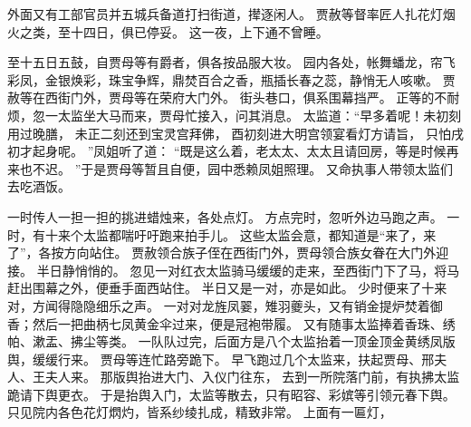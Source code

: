 外面又有工部官员并五城兵备道打扫街道，撵逐闲人。
贾赦等督率匠人扎花灯烟火之类，至十四日，俱已停妥。
这一夜，上下通不曾睡。
\par
至十五日五鼓，自贾母等有爵者，俱各按品服大妆。
园内各处，帐舞蟠龙，帘飞彩凤，金银焕彩，珠宝争辉，鼎焚百合之香，瓶插长春之蕊，静悄无人咳嗽。
贾赦等在西街门外，贾母等在荣府大门外。
街头巷口，俱系围幕挡严。
正等的不耐烦，忽一太监坐大马而来，贾母忙接入，问其消息。
太监道：“早多着呢！未初刻用过晚膳，
未正二刻还到宝灵宫拜佛，
酉初刻进大明宫领宴看灯方请旨，
只怕戌初才起身呢。
”凤姐听了道：
“既是这么着，老太太、太太且请回房，等是时候再来也不迟。
”于是贾母等暂且自便，园中悉赖凤姐照理。
又命执事人带领太监们去吃酒饭。
\par
一时传人一担一担的挑进蜡烛来，各处点灯。
方点完时，忽听外边马跑之声。
一时，有十来个太监都喘吁吁跑来拍手儿。
这些太监会意，都知道是“来了，来了”，各按方向站住。
贾赦领合族子侄在西街门外，贾母领合族女眷在大门外迎接。
半日静悄悄的。
忽见一对红衣太监骑马缓缓的走来，至西街门下了马，将马赶出围幕之外，便垂手面西站住。
半日又是一对，亦是如此。
少时便来了十来对，方闻得隐隐细乐之声。
一对对龙旌凤翣，雉羽夔头，又有销金提炉焚着御香；然后一把曲柄七凤黄金伞过来，便是冠袍带履。
又有随事太监捧着香珠、绣帕、漱盂、拂尘等类。
一队队过完，后面方是八个太监抬着一顶金顶金黄绣凤版舆，缓缓行来。
贾母等连忙路旁跪下。
早飞跑过几个太监来，扶起贾母、邢夫人、王夫人来。
那版舆抬进大门、入仪门往东，
去到一所院落门前，有执拂太监跪请下舆更衣。
于是抬舆入门，太监等散去，只有昭容、彩嫔等引领元春下舆。
只见院内各色花灯熌灼，皆系纱绫扎成，精致非常。
上面有一匾灯，
